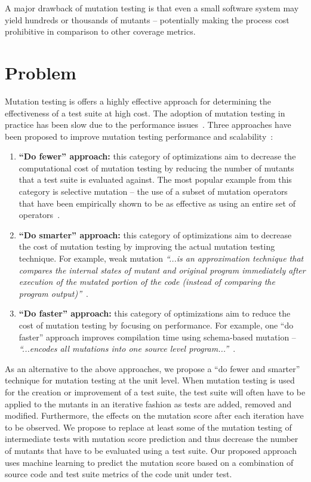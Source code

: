 A major drawback of mutation testing is that even a small software system may yield hundreds or thousands of mutants -- potentially making the process cost prohibitive in comparison to other coverage metrics.


\section{Problem}
\label{sec:introduction_problem}
Mutation testing is offers a highly effective approach for determining the effectiveness of a test suite at high cost. The adoption of mutation testing in practice has been slow due to the performance issues~\cite{?}. Three approaches have been proposed to improve mutation testing performance and scalability~\cite{OU00}:

\begin{enumerate}
  \item \textbf{``Do fewer'' approach:} this category of optimizations aim to decrease the computational cost of mutation testing by reducing the number of mutants that a test suite is evaluated against. The most popular example from this category is selective mutation -- the use of a subset of mutation operators that have been empirically shown to be as effective as using an entire set of operators~\cite{OLR+96}.

  \item \textbf{``Do smarter'' approach:} this category of optimizations aim to decrease the cost of mutation testing by improving the actual mutation testing technique. For example, weak mutation \emph{``...is an approximation technique that compares the internal states of mutant and original program immediately after execution of the mutated portion of the code (instead of comparing the program output)''}~\cite{OU00}.

  \item \textbf{``Do faster'' approach:} this category of optimizations aim to reduce the cost of mutation testing by focusing on performance. For example, one ``do faster'' approach improves compilation time using schema-based mutation -- \emph{``...encodes all mutations into one source level program...''}~\cite{OU00}.
\end{enumerate}

As an alternative to the above approaches, we propose a ``do fewer and smarter'' technique for mutation testing at the unit level. When mutation testing is used for the creation or improvement of a test suite, the test suite will often have to be applied to the mutants in an iterative fashion as tests are added, removed and modified. Furthermore, the effects on the mutation score after each iteration have to be observed. We propose to replace at least some of the mutation testing of intermediate tests with mutation score prediction and thus decrease the number of mutants that have to be evaluated using a test suite. Our proposed approach uses machine learning to predict the mutation score based on a combination of source code and test suite metrics of the code unit under test.


